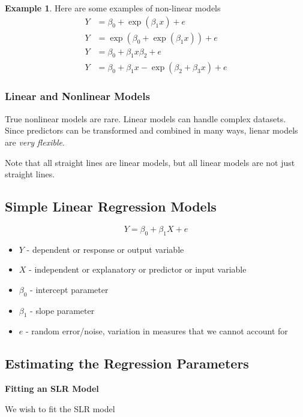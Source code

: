 \documentclass[11pt]{article}
\theoremstyle{definition}
\newtheorem{example}{Example}[section]
\numberwithin{equation}{section}
\begin{document}
\begin{example}
  Here are some examples of non-linear models
  \begin{align}
    Y &= \beta_0 + \exp(\beta_1 x) + e\\
    Y &= \exp(\beta_0 + \exp(\beta_1 x)) + e\\
    Y &= \beta_0 + \beta_1 x\beta_2 + e\\
    Y &= \beta_0 + \beta_1 x - \exp(\beta_2 + \beta_3 x) + e
  \end{align}
\end{example}

\subsubsection{Linear and Nonlinear Models}

True nonlinear models are rare. Linear models can handle complex datasets. Since predictors can be transformed and combined in many ways, lienar models are \textit{very flexible}.

Note that all straight lines are linear models, but all linear models are not just straight lines.

\subsection{Simple Linear Regression Models}

\begin{equation}
  Y = \beta_0 + \beta_1 X + e
\end{equation}
\begin{itemize}
\item $Y$ - dependent or response or output variable
\item $X$ - independent or explanatory or predictor or input variable
\item $\beta_0$ - intercept parameter
\item $\beta_1$ - slope parameter
\item $e$ - random error/noise, variation in measures that we cannot account for
\end{itemize}

\subsection{Estimating the Regression Parameters}

\textbf{Fitting an SLR Model}

We wish to fit the SLR model
\end{document}
